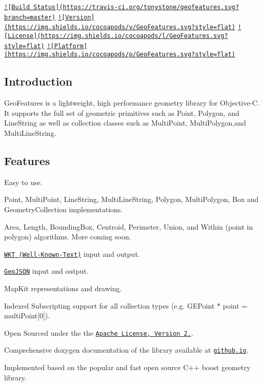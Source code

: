 \href{https://travis-ci.org/tonystone/geofeatures}{\tt !\mbox{[}Build Status\mbox{]}(https\+://travis-\/ci.\+org/tonystone/geofeatures.\+svg?branch=master)} \href{http://cocoapods.org/pods/GeoFeatures}{\tt !\mbox{[}Version\mbox{]}(https\+://img.\+shields.\+io/cocoapods/v/\+Geo\+Features.\+svg?style=flat)} \href{http://cocoapods.org/pods/GeoFeatures}{\tt !\mbox{[}License\mbox{]}(https\+://img.\+shields.\+io/cocoapods/l/\+Geo\+Features.\+svg?style=flat)} \href{http://cocoapods.org/pods/GeoFeatures}{\tt !\mbox{[}Platform\mbox{]}(https\+://img.\+shields.\+io/cocoapods/p/\+Geo\+Features.\+svg?style=flat)}

\subsection*{Introduction}

Geo\+Features is a lightweight, high performance geometry library for Objective-\/\+C. It supports the full set of geometric primitives such as Point, Polygon, and Line\+String as well as collection classes such as Multi\+Point, Multi\+Polygon,and Multi\+Line\+String.



\subsection*{Features}


\begin{DoxyItemize}
\item Easy to use.
\item Point, Multi\+Point, Line\+String, Multi\+Line\+String, Polygon, Multi\+Polygon, Box and Geometry\+Collection implementations.
\item Area, Length, Bounding\+Box, Centroid, Perimeter, Union, and Within (point in polygon) algorithms. More coming soon.
\item \href{https://en.wikipedia.org/wiki/Well-known_text}{\tt W\+K\+T (Well-\/\+Known-\/\+Text)} input and output.
\item \href{http://geojson.org/}{\tt Geo\+J\+S\+O\+N} input and output.
\item Map\+Kit representations and drawing.
\item Indexed Subscripting support for all collection types (e.\+g. {\ttfamily G\+E\+Point $\ast$ point = multi\+Point\mbox{[}0\mbox{]}}).
\item Open Sourced under the the \href{http://www.apache.org/licenses/LICENSE-2.0.html}{\tt Apache License, Version 2.}.
\item Comprehensive doxygen documentation of the library available at \href{http://tonystone.github.io/geofeatures}{\tt github.\+io}.
\item Implemented based on the popular and fast open source C++ boost geometry library.
\end{DoxyItemize}

